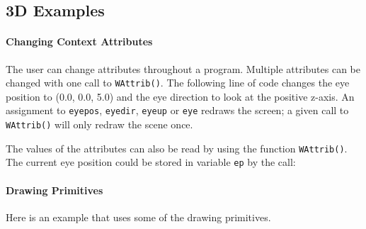 \subsection*{3D Examples}

\paragraph{Changing Context Attributes}
The user can change attributes throughout a program. Multiple
attributes can be changed with one call to \texttt{WAttrib()}.  The
following line of code changes the eye position to (0.0, 0.0, 5.0) and
the eye direction to look at the positive z-axis. An assignment to
\texttt{eyepos}, \texttt{eyedir}, \texttt{eyeup} or \texttt{eye}
redraws the screen; a given call to \texttt{WAttrib()} will only
redraw the scene once.


The values of the attributes can also be read by using the function
\texttt{WAttrib()}. The current eye position could be stored in variable
\texttt{ep} by the call:


\paragraph{Drawing Primitives}
Here is an example that uses some of the drawing primitives. 


